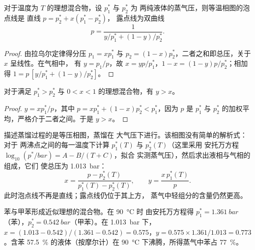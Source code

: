 \begin{proposition}[理想曲线]\label{prop:b2:liquid-vapour-diagrams:ideal-curves}
对于温度为 $T$ 的理想混合物，设 $p_1^*$ 与 $p_2^*$ 为
两纯液体的蒸气压，则等温相图的泡点线是
直线 $p = p_2^* + x(p_1^* - p_2^*)$，
露点线为双曲线
\[
  p = \frac{1}{y/p_1^* + (1 - y)/p_2^*} .
\]
\end{proposition}

\begin{proof}
由拉乌尔定律得分压 $p_1 = xp_1^*$ 与 $p_2 = (1 -
x)p_2^*$，二者之和即总压，关于 $x$ 呈线性。在气相中，
有 $y = p_1/p$，故 $x = yp/p_1^*$，$1 - x = (1 - y)p/p_2^*$；相加得
$1 = p\,[y/p_1^* + (1 - y)/p_2^*]$。
\end{proof}

\begin{proposition}[蒸气中易挥发组分的含量更高]\label{prop:b2:liquid-vapour-diagrams:richer}
对于满足 $p_1^* > p_2^*$ 与 $0 < x < 1$ 的理想混合物，有 $y > x$。
\end{proposition}

\begin{proof}
$y = xp_1^*/p$，其中 $p = xp_1^* + (1 - x)p_2^* < p_1^*$，因为 $p$ 是
$p_1^*$ 与 $p_2^*$ 的加权平均，严格介于二者之间。于是 $y >
x$。
\end{proof}

描述蒸馏过程的是等压相图，蒸馏在
大气压下进行。该相图没有简单的解析式：对于
两沸点之间的每一温度下计算 $p_1^*(T)$ 与 $p_2^*(T)$（这里采用
安托万方程 $\log_{10}(p^*/\unit{bar}) = A - B/(T + C)$，拟合
实测蒸气压），然后求出液相与气相的组成，它们
使总压为 \qty{1.013}{bar}：
\[
  x = \frac{p - p_2^*(T)}{p_1^*(T) - p_2^*(T)}, \qquad y = \frac{x\,p_1^*(T)}{p} .
\]
此时泡点线不再是直线；露点线仍位于其上方，
蒸气中轻组分的含量仍然更高。

\begin{example}\label{ex:b2:liquid-vapour-diagrams:benzene-toluene}
苯与甲苯形成近似理想的混合物。在 \qty{90}{\degreeCelsius} 时
由安托万方程得 $p_1^* = \qty{1.361}{bar}$（苯），$p_2^* =
\qty{0.542}{bar}$（甲苯）。在 \qty{1.013}{bar} 下，$x = (1.013 - 0.542)/(1.361 -
0.542) = 0.575$，$y = 0.575 \times 1.361/1.013 = 0.773$。含苯 57.5~\%
的液体（按摩尔计）在 \qty{90}{\degreeCelsius} 下沸腾，所得蒸气中苯占
77~\%。
\end{example}


